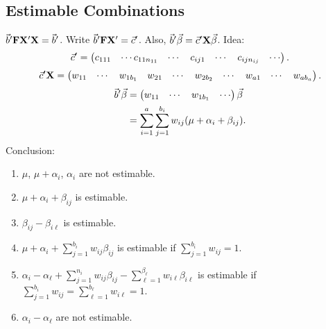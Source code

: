 \subsection*{Estimable Combinations}
$ \vec{b}'\mathbf{F}\mathbf{X}'\mathbf{X}=\vec{b}' $.
Write $ \vec{b}'\mathbf{F}\mathbf{X}'=\vec{c}' $.
Also, $ \vec{b}'\vec{\beta}=\vec{c}'\mathbf{X}\vec{\beta} $. Idea:
\[ \vec{c}'=\begin{pmatrix}
        c_{111} & \cdots c_{11n_{11}} & \cdots & c_{ij1} & \cdots & c_{ijn_{ij}} & \cdots
    \end{pmatrix}. \]
\[ \vec{c}'\mathbf{X}=\begin{pmatrix}
        w_{11} & \cdots & w_{1b_1} & w_{21} & \cdots & w_{2b_2} & \cdots & w_{a1} & \cdots & w_{ab_a}
    \end{pmatrix}. \]
\begin{align*}
    \vec{b}'\vec{\beta}
     & =\begin{pmatrix}
            w_{11} & \cdots & w_{1b_1} & \cdots
        \end{pmatrix}\vec{\beta}                            \\
     & =\sum_{i=1}^{a}\sum_{j=1}^{b_i}w_{ij}(\mu+\alpha_i+\beta_{ij}).
\end{align*}
Conclusion:
\begin{enumerate}[(1)]
    \item $ \mu $, $ \mu+\alpha_i $, $ \alpha_i $ are not estimable.
    \item $ \mu+\alpha_i+\beta_{ij} $ is estimable.
    \item $ \beta_{ij}-\beta_{i\ell} $ is estimable.
    \item $ \mu+\alpha_i+\sum_{j=1}^{b_i}w_{ij}\beta_{ij} $ is estimable if $ \sum_{j=1}^{b_i}w_{ij}=1 $.
    \item $ \alpha_i-\alpha_\ell+\sum_{j=1}^{n_i}w_{ij}\beta_{ij}-\sum_{\ell=1}^{\beta_\ell}w_{i\ell}\beta_{i\ell} $
          is estimable if $ \sum_{j=1}^{b_i}w_{ij}=\sum_{\ell=1}^{b_\ell}w_{i\ell}=1 $.
    \item $ \alpha_i-\alpha_\ell $ are not estimable.
\end{enumerate}
